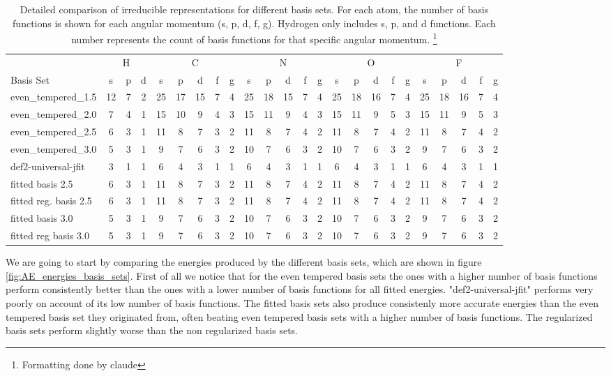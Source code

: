 \begin{table}
\centering
\tiny
\begin{tabular}{|l|ccc|ccccc|ccccc|ccccc|ccccc|}
\hline
& \multicolumn{3}{c|}{H} & \multicolumn{5}{c|}{C} & \multicolumn{5}{c|}{N} & \multicolumn{5}{c|}{O} & \multicolumn{5}{c|}{F} \\
Basis Set & s & p & d & s & p & d & f & g & s & p & d & f & g & s & p & d & f & g & s & p & d & f & g \\
\hline
even\_tempered\_1.5 & 12 & 7 & 2 & 25 & 17 & 15 & 7 & 4 & 25 & 18 & 15 & 7 & 4 & 25 & 18 & 16 & 7 & 4 & 25 & 18 & 16 & 7 & 4 \\
even\_tempered\_2.0 & 7 & 4 & 1 & 15 & 10 & 9 & 4 & 3 & 15 & 11 & 9 & 4 & 3 & 15 & 11 & 9 & 5 & 3 & 15 & 11 & 9 & 5 & 3 \\
even\_tempered\_2.5 & 6 & 3 & 1 & 11 & 8 & 7 & 3 & 2 & 11 & 8 & 7 & 4 & 2 & 11 & 8 & 7 & 4 & 2 & 11 & 8 & 7 & 4 & 2 \\
even\_tempered\_3.0 & 5 & 3 & 1 & 9 & 7 & 6 & 3 & 2 & 10 & 7 & 6 & 3 & 2 & 10 & 7 & 6 & 3 & 2 & 9 & 7 & 6 & 3 & 2 \\
def2-universal-jfit & 3 & 1 & 1 & 6 & 4 & 3 & 1 & 1 & 6 & 4 & 3 & 1 & 1 & 6 & 4 & 3 & 1 & 1 & 6 & 4 & 3 & 1 & 1 \\
fitted basis 2.5 & 6 & 3 & 1 & 11 & 8 & 7 & 3 & 2 & 11 & 8 & 7 & 4 & 2 & 11 & 8 & 7 & 4 & 2 & 11 & 8 & 7 & 4 & 2 \\
fitted reg. basis 2.5 & 6 & 3 & 1 & 11 & 8 & 7 & 3 & 2 & 11 & 8 & 7 & 4 & 2 & 11 & 8 & 7 & 4 & 2 & 11 & 8 & 7 & 4 & 2 \\
fitted basis 3.0 & 5 & 3 & 1 & 9 & 7 & 6 & 3 & 2 & 10 & 7 & 6 & 3 & 2 & 10 & 7 & 6 & 3 & 2 & 9 & 7 & 6 & 3 & 2 \\
fitted reg basis 3.0 & 5 & 3 & 1 & 9 & 7 & 6 & 3 & 2 & 10 & 7 & 6 & 3 & 2 & 10 & 7 & 6 & 3 & 2 & 9 & 7 & 6 & 3 & 2 \\
\hline
\end{tabular}
\caption{Detailed comparison of irreducible representations for different basis sets. For each atom, the number of basis functions is shown for each angular momentum (s, p, d, f, g). Hydrogen only includes s, p, and d functions. Each number represents the count of basis functions for that specific angular momentum. \footnote{Formatting done by claude}}
\label{tab:basis-comparison-detailed}
\end{table}
We are going to start by comparing the energies produced by the different basis sets, which are shown in figure \ref{fig:AE_energies_basis_sets}. First of all we notice that for the even tempered basis sets the ones with a higher number of basis functions perform consistently better than the ones with a lower number of basis functions for all fitted energies. "def2-universal-jfit" performs very poorly on account of its low number of basis functions. The fitted basis sets also produce consistenly more accurate energies than the even tempered basis set they originated from, often beating even tempered basis sets with a higher number of basis functions. The regularized basis sets perform slightly worse than the non regularized basis sets. \\
